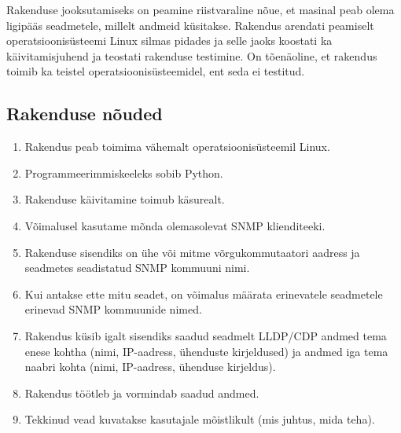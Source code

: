 \documentclass[12pt]{article}
\begin{document}
Rakenduse jooksutamiseks on peamine riistvaraline nõue, et masinal peab olema ligipääs seadmetele,
millelt andmeid küsitakse.
Rakendus arendati peamiselt operatsioonisüsteemi Linux silmas pidades ja selle jaoks koostati ka
käivitamisjuhend ja teostati rakenduse testimine.
On tõenäoline, et rakendus toimib ka teistel operatsioonisüsteemidel, ent seda ei testitud.

\subsection{Rakenduse nõuded}
\begin{enumerate}
    \item Rakendus peab toimima vähemalt operatsioonisüsteemil Linux.
    \item Programmeerimmiskeeleks sobib Python.
    \item Rakenduse käivitamine toimub käsurealt.
    \item Võimalusel kasutame mõnda olemasolevat SNMP klienditeeki.
    \item Rakenduse sisendiks on ühe või mitme võrgukommutaatori aadress ja seadmetes seadistatud
    SNMP kommuuni nimi.
    \item \label{itm:req:diffcommunities} Kui antakse ette mitu seadet, on võimalus määrata
    erinevatele seadmetele erinevad SNMP kommuunide nimed.

    \item Rakendus küsib igalt sisendiks saadud seadmelt LLDP/CDP andmed tema enese kohtha (nimi,
    IP-aadress, ühenduste kirjeldused) ja andmed iga tema naabri kohta (nimi, IP-aadress,
    ühenduse kirjeldus).
    \item Rakendus töötleb ja vormindab saadud andmed.
    \item Tekkinud vead kuvatakse kasutajale mõistlikult (mis juhtus, mida teha).


\end{enumerate}
\end{document}
